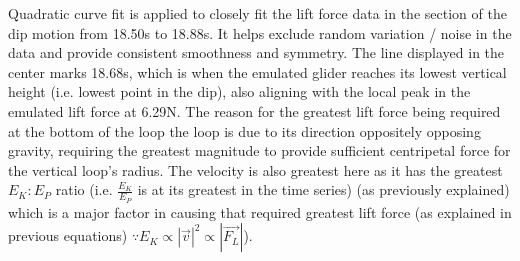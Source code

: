 \documentclass[11pt, a4paper]{article}
\begin{document}
	Quadratic curve fit is applied to closely fit the lift force data in the section of the dip motion from 18.50s to 18.88s. It helps exclude random variation / noise in the data and provide consistent smoothness and symmetry. The line displayed in the center marks 18.68s, which is when the emulated glider reaches its lowest vertical height (i.e. lowest point in the dip), also aligning with the local peak in the emulated lift force at 6.29N. The reason for the greatest lift force being required at the bottom of the loop the loop is due to its direction oppositely opposing gravity, requiring the greatest magnitude to provide sufficient centripetal force for the vertical loop's radius. The velocity is also greatest here as it has the greatest $E_K:E_P$ ratio (i.e. $\frac{E_K}{E_P}$ is at its greatest in the time series) (as previously explained) which is a major factor in causing that required greatest lift force (as explained in previous equations) $\because E_K\propto|\vec{v}|^2\propto |\vec{F_L}|$).
\end{document}
